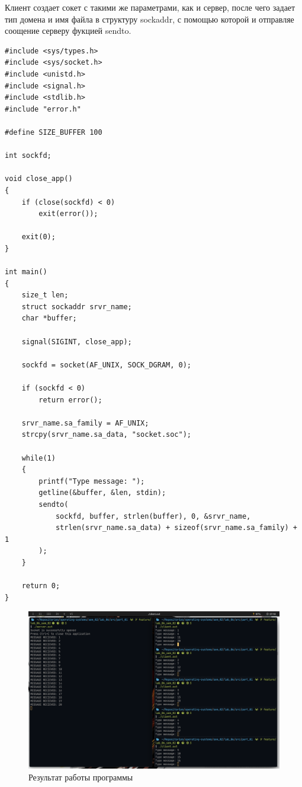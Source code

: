 Клиент создает сокет с такими же параметрами, как и сервер, после чего задает тип домена и имя файла в структуру {\ttfamily sockaddr}, с помощью которой и отправляе соощение серверу фукцией {\ttfamily sendto}.

\begin{lstlisting}[caption=Текст программы клиента]
#include <sys/types.h>
#include <sys/socket.h>
#include <unistd.h>
#include <signal.h>
#include <stdlib.h>
#include "error.h"

#define SIZE_BUFFER 100

int sockfd;

void close_app()
{
    if (close(sockfd) < 0)
        exit(error());

    exit(0);
}

int main()
{
    size_t len;
    struct sockaddr srvr_name;
    char *buffer;

    signal(SIGINT, close_app);

    sockfd = socket(AF_UNIX, SOCK_DGRAM, 0);

    if (sockfd < 0)
        return error();

    srvr_name.sa_family = AF_UNIX;
    strcpy(srvr_name.sa_data, "socket.soc");

    while(1)
    {
        printf("Type message: ");
        getline(&buffer, &len, stdin);
        sendto(
            sockfd, buffer, strlen(buffer), 0, &srvr_name,
            strlen(srvr_name.sa_data) + sizeof(srvr_name.sa_family) + 1
        );
    }

    return 0;
}
\end{lstlisting}

\begin{figure}[H]
    \centering
    \includegraphics[scale=0.4]{img/file_socket.png}
    \caption{Результат работы программы}
\end{figure}

